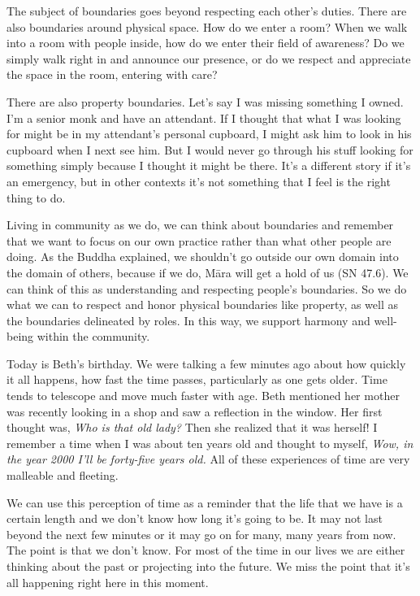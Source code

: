 The subject of boundaries goes beyond respecting each other's duties. 
There are also boundaries around physical space. How do we enter a 
room? When we walk into a room with people inside, how do we enter 
their field of awareness? Do we simply walk right in and announce our 
presence, or do we respect and appreciate the space in the room, 
entering with care?

There are also property boundaries. Let's say I was missing something I 
owned. I'm a senior monk and have an attendant. If I thought that what 
I was looking for might be in my attendant's personal cupboard, I might 
ask him to look in his cupboard when I next see him. But I would never 
go through his stuff looking for something simply because I thought it 
might be there. It's a different story if it's an emergency, but in 
other contexts it's not something that I feel is the right thing to do.

Living in community as we do, we can think about boundaries and 
remember that we want to focus on our own practice rather than what 
other people are doing. As the Buddha explained, we shouldn't go 
outside our own domain into the domain of others, because if we do, 
Māra will get a hold of us (SN 47.6). We can think of this as 
understanding and respecting people's boundaries. So we do what we can 
to respect and honor physical boundaries like property, as well as the 
boundaries delineated by roles. In this way, we support harmony and 
well-being within the community.


Today is Beth's birthday. We were talking a few minutes ago about how 
quickly it all happens, how fast the time passes, particularly as one 
gets older. Time tends to telescope and move much faster with age. Beth 
mentioned her mother was recently looking in a shop and saw a 
reflection in the window. Her first thought was, \emph{Who is that old 
lady?} Then she realized that it was herself! I remember a time when I 
was about ten years old and thought to myself, \emph{Wow, in the year 
2000 I'll be forty-five years old.} All of these experiences of time 
are very malleable and fleeting.

We can use this perception of time as a reminder that the life that we 
have is a certain length and we don't know how long it's going to be. 
It may not last beyond the next few minutes or it may go on for many, 
many years from now. The point is that we don't know. For most of the 
time in our lives we are either thinking about the past or projecting 
into the future. We miss the point that it's all happening right here 
in this moment.

